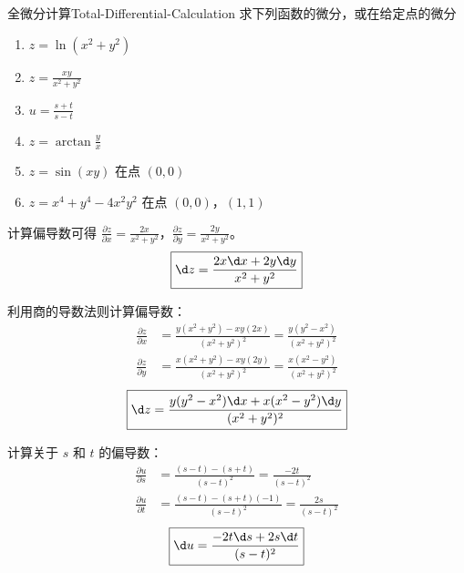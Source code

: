 \begin{problem}{全微分计算}{Total-Differential-Calculation}
    求下列函数的微分，或在给定点的微分
    \begin{enumerate}
        \item $z = \ln(x^2 + y^2)$
        \item $z = \frac{xy}{x^2 + y^2}$
        \item $u = \frac{s + t}{s - t}$
        \item $z = \arctan \frac{y}{x}$
        \item $z = \sin(xy)$ 在点 $(0,0)$
        \item $z = x^4 + y^4 - 4x^2y^2$ 在点 $(0,0)$，$(1,1)$
    \end{enumerate}
\end{problem}

\begin{solution}
    计算偏导数可得 $\frac{\partial z}{\partial x} = \frac{2x}{x^2+y^2}$，$\frac{\partial z}{\partial y} = \frac{2y}{x^2+y^2}$。
    \begin{equation}
        \boxed{\d z = \frac{2x \d x + 2y \d y}{x^2 + y^2}}
    \end{equation}

    利用商的导数法则计算偏导数：
    \begin{equation}
        \begin{aligned}
            \frac{\partial z}{\partial x} & = \frac{y(x^2 + y^2) - xy(2x)}{(x^2 + y^2)^2} = \frac{y(y^2 - x^2)}{(x^2 + y^2)^2} \\
            \frac{\partial z}{\partial y} & = \frac{x(x^2 + y^2) - xy(2y)}{(x^2 + y^2)^2} = \frac{x(x^2 - y^2)}{(x^2 + y^2)^2}
        \end{aligned}
    \end{equation}
    \begin{equation}
        \boxed{\d z = \frac{y(y^2 - x^2) \d x + x(x^2 - y^2) \d y}{(x^2 + y^2)^2}}
    \end{equation}

    计算关于 $s$ 和 $t$ 的偏导数：
    \begin{equation}
        \begin{aligned}
            \frac{\partial u}{\partial s} & = \frac{(s - t) - (s + t)}{(s - t)^2} = \frac{-2t}{(s - t)^2}    \\
            \frac{\partial u}{\partial t} & = \frac{(s - t) - (s + t)(-1)}{(s - t)^2} = \frac{2s}{(s - t)^2}
        \end{aligned}
    \end{equation}
    \begin{equation}
        \boxed{\d u = \frac{-2t \d s + 2s \d t}{(s - t)^2}}
    \end{equation}


\end{solution}
